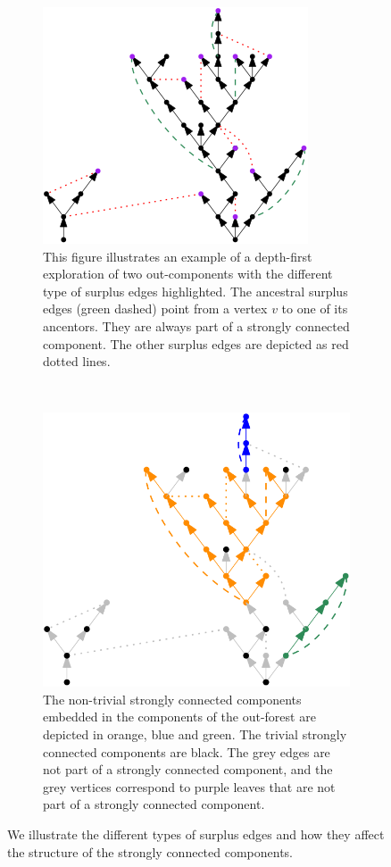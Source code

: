 \begin{figure}
\centering
\begin{subfigure}{0.7\textwidth}
 \centering
    \includegraphics[width=0.7\linewidth]{Content/Pictures/Types of surplus edges.png}
    \caption{This figure illustrates an example of a depth-first exploration of two out-components with the different type of surplus edges highlighted. The ancestral surplus edges (green dashed) point from a vertex $v$ to one of its ancentors. They are always part of a strongly connected component. The other surplus edges are depicted as red dotted lines.}
    \label{subfigure.typesofsurplusedges} 
\end{subfigure}\\
\begin{subfigure}{0.7\textwidth}
  \centering
  \includegraphics[width=0.7\linewidth]{Content/Pictures/SCC in example.png}
  \caption{The non-trivial strongly connected components embedded in the components of the out-forest are depicted in orange, blue and green. The trivial strongly connected components are black. The grey edges are not part of a strongly connected component, and the grey vertices correspond to purple leaves that are not part of a strongly connected component.}
    \label{subfigure.sccinexample}
\end{subfigure}
\caption{We illustrate the different types of surplus edges and how they affect the structure of the strongly connected components.}
\end{figure}

